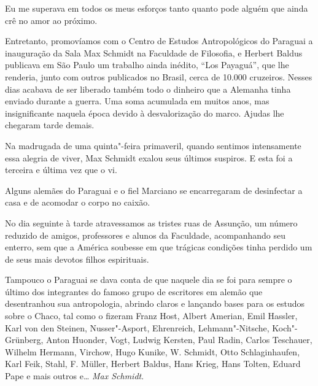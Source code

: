 Eu me superava em todos os meus esforços tanto quanto pode alguém que
ainda crê no amor ao próximo.

Entretanto, promovíamos com o Centro de Estudos Antropológicos do
Paraguai a inauguração da Sala Max Schmidt na Faculdade de Filosofia, e
Herbert Baldus publicava em São Paulo um trabalho ainda inédito, ``Los
Payaguá'', que lhe renderia, junto com outros publicados no Brasil,
cerca de 10.000 cruzeiros. Nesses dias acabava de ser liberado também
todo o dinheiro que a Alemanha tinha enviado durante a guerra. Uma soma
acumulada em muitos anos, mas insignificante naquela época devido à
desvalorização do marco. Ajudas lhe chegaram tarde demais.

Na madrugada de uma quinta"-feira primaveril, quando sentimos
intensamente essa alegria de viver, Max Schmidt exalou seus últimos
suspiros. E esta foi a terceira e última vez que o vi.

Alguns alemães do Paraguai e o fiel Marciano se encarregaram de
desinfectar a casa e de acomodar o corpo no caixão.

No dia seguinte à tarde atravessamos as tristes ruas de Assunção, um
número reduzido de amigos, professores e alunos da Faculdade,
acompanhando seu enterro, sem que a América soubesse em que trágicas
condições tinha perdido um de seus mais devotos filhos espirituais.

Tampouco o Paraguai se dava conta de que naquele dia se foi para sempre
o último dos integrantes do famoso grupo de escritores em alemão que
desentranhou sua antropologia, abrindo claros e lançando bases para os
estudos sobre o Chaco, tal como o fizeram Franz Host, Albert Amerian,
Emil Hassler, Karl von den Steinen, Nusser"-Asport, Ehrenreich,
Lehmann"-Nitsche, Koch"-Grünberg, Anton Huonder, Vogt, Ludwig Kersten,
Paul Radin, Carlos Teschauer, Wilhelm Hermann, Virchow, Hugo Kunike, W.
Schmidt, Otto Schlaginhaufen, Karl Feik, Stahl, F. Müller, Herbert
Baldus, Hans Krieg, Hans Tolten, Eduard Pape e mais outros e\ldots{} \textit{Max
Schmidt}.

